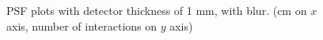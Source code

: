 \documentclass[a4paper]{article}
\begin{document}
\begin{figure}[H]
  \caption{PSF plots with detector thickness of 1 mm, with blur. (cm on $x$ axis, number of interactions on $y$ axis)}
  \label{fig:010_xse}
\end{figure}
\end{document}
